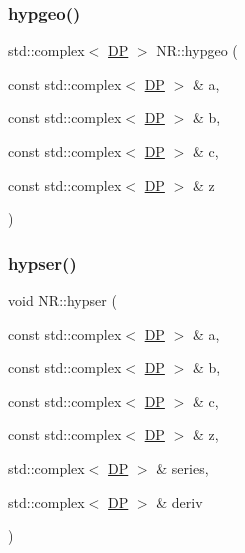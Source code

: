 \mbox{\label{namespaceNR_a8666a2088d3699fe0bc7f14f0b51b5ed}} 
\subsubsection{\texorpdfstring{hypgeo()}{hypgeo()}}
{\footnotesize\ttfamily std\+::complex$<$ \mbox{\hyperlink{namespaceNR_af6ff762dd605ff477b8e52387253a02a}{DP}} $>$ N\+R\+::hypgeo (\begin{DoxyParamCaption}\item[{const std\+::complex$<$ \mbox{\hyperlink{namespaceNR_af6ff762dd605ff477b8e52387253a02a}{DP}} $>$ \&}]{a,  }\item[{const std\+::complex$<$ \mbox{\hyperlink{namespaceNR_af6ff762dd605ff477b8e52387253a02a}{DP}} $>$ \&}]{b,  }\item[{const std\+::complex$<$ \mbox{\hyperlink{namespaceNR_af6ff762dd605ff477b8e52387253a02a}{DP}} $>$ \&}]{c,  }\item[{const std\+::complex$<$ \mbox{\hyperlink{namespaceNR_af6ff762dd605ff477b8e52387253a02a}{DP}} $>$ \&}]{z }\end{DoxyParamCaption})}

\mbox{\label{namespaceNR_a5464226b1eb7a8ab468acb9d8194a5cb}} 
\subsubsection{\texorpdfstring{hypser()}{hypser()}}
{\footnotesize\ttfamily void N\+R\+::hypser (\begin{DoxyParamCaption}\item[{const std\+::complex$<$ \mbox{\hyperlink{namespaceNR_af6ff762dd605ff477b8e52387253a02a}{DP}} $>$ \&}]{a,  }\item[{const std\+::complex$<$ \mbox{\hyperlink{namespaceNR_af6ff762dd605ff477b8e52387253a02a}{DP}} $>$ \&}]{b,  }\item[{const std\+::complex$<$ \mbox{\hyperlink{namespaceNR_af6ff762dd605ff477b8e52387253a02a}{DP}} $>$ \&}]{c,  }\item[{const std\+::complex$<$ \mbox{\hyperlink{namespaceNR_af6ff762dd605ff477b8e52387253a02a}{DP}} $>$ \&}]{z,  }\item[{std\+::complex$<$ \mbox{\hyperlink{namespaceNR_af6ff762dd605ff477b8e52387253a02a}{DP}} $>$ \&}]{series,  }\item[{std\+::complex$<$ \mbox{\hyperlink{namespaceNR_af6ff762dd605ff477b8e52387253a02a}{DP}} $>$ \&}]{deriv }\end{DoxyParamCaption})}

